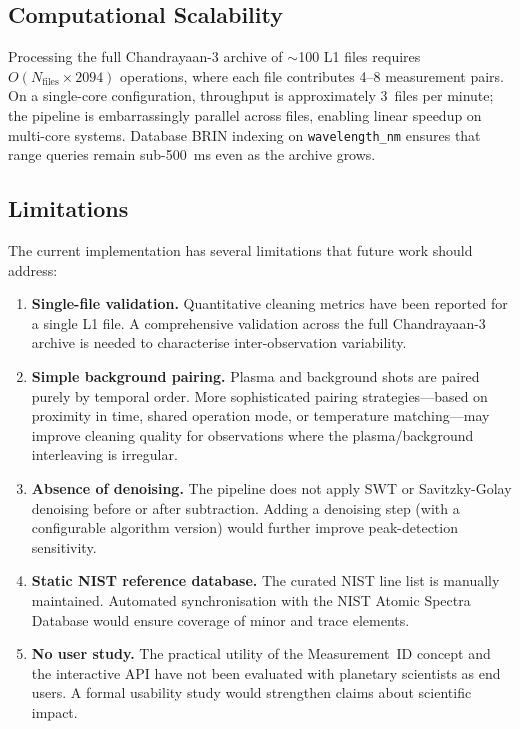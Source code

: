 \documentclass[a4paper,twocolumn,10pt]{article}
\begin{document}
\subsection{Computational Scalability}

Processing the full Chandrayaan-3 archive of $\sim$100 L1 files
requires $O(N_{\text{files}} \times 2094)$ operations, where each
file contributes 4--8 measurement pairs.  On a single-core
configuration, throughput is approximately 3~files per minute;
the pipeline is embarrassingly parallel across files, enabling
linear speedup on multi-core systems.  Database BRIN indexing
on \texttt{wavelength\_nm} ensures that range queries remain
sub-\SI{500}{\milli\second} even as the archive grows.

\subsection{Limitations}

The current implementation has several limitations that future work
should address:

\begin{enumerate}[nosep,leftmargin=*]
  \item \textbf{Single-file validation.}  Quantitative cleaning
    metrics have been reported for a single L1 file.  A comprehensive
    validation across the full Chandrayaan-3 archive is needed to
    characterise inter-observation variability.

  \item \textbf{Simple background pairing.}  Plasma and background
    shots are paired purely by temporal order.  More sophisticated
    pairing strategies---based on proximity in time, shared operation
    mode, or temperature matching---may improve cleaning quality
    for observations where the plasma/background interleaving
    is irregular.

  \item \textbf{Absence of denoising.}  The pipeline does not apply
    SWT or Savitzky-Golay denoising before or after subtraction.
    Adding a denoising step (with a configurable algorithm version)
    would further improve peak-detection sensitivity.

  \item \textbf{Static NIST reference database.}  The curated NIST
    line list is manually maintained.  Automated synchronisation with
    the NIST Atomic Spectra Database would ensure coverage of minor
    and trace elements.

  \item \textbf{No user study.}  The practical utility of the
    Measurement~ID concept and the interactive API have not been
    evaluated with planetary scientists as end users.  A formal
    usability study would strengthen claims about scientific impact.
\end{enumerate}
\end{document}
